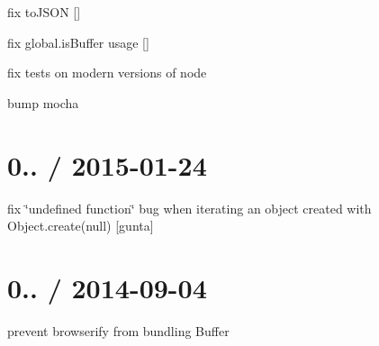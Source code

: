 
\begin{DoxyItemize}
\item fix to\+J\+S\+ON \mbox{[}\mbox{]}
\item fix {\ttfamily global.\+is\+Buffer} usage \mbox{[}\mbox{]}
\item fix tests on modern versions of node
\item bump mocha
\end{DoxyItemize}

\section*{0.. / 2015-\/01-\/24 }


\begin{DoxyItemize}
\item fix \char`\"{}undefined function\char`\"{} bug when iterating an object created with Object.\+create(null) \mbox{[}gunta\mbox{]}
\end{DoxyItemize}

\section*{0.. / 2014-\/09-\/04 }


\begin{DoxyItemize}
\item prevent browserify from bundling {\ttfamily Buffer} 
\end{DoxyItemize}